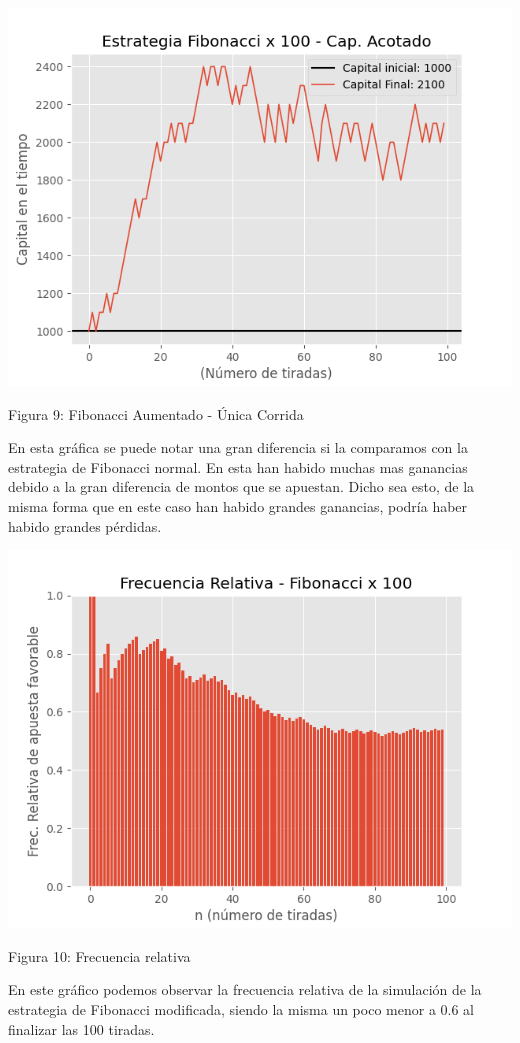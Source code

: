 \documentclass{article}
\begin{document}
\begin{center}
    \includegraphics[width=0.7\linewidth]{FIBx100-acotado-1tirada.png}
    
    \caption{Figura 9: Fibonacci Aumentado - Única Corrida}
\end{center}

En esta gráfica se puede notar una gran diferencia si la comparamos con la estrategia de Fibonacci normal. En esta han habido muchas mas ganancias debido a la gran diferencia de montos que se apuestan. Dicho sea esto, de la misma forma que en este caso han habido grandes ganancias, podría haber habido grandes pérdidas.

\begin{center}
    \includegraphics[width=0.7\linewidth]{FreRel-FIBx100.png}
    
    \caption{Figura 10: Frecuencia relativa}
\end{center}

En este gráfico podemos observar la frecuencia relativa de la simulación de la estrategia de Fibonacci modificada, siendo la misma un poco menor a 0.6 al finalizar las 100 tiradas.
\end{document}
